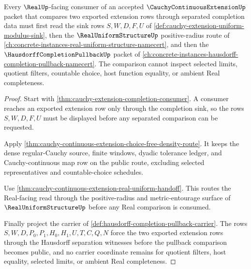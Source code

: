 \begin{theorem}
\label{thm:cauchy-continuous-extension-hausdorff-pullback-route}
Every $\RealUp$-facing consumer of an accepted $\CauchyContinuousExtensionUp$ packet that compares two exported extension rows through separated completion data must first read the sink rows $S,W,D,F,U$ of \autoref{def:cauchy-extension-uniform-modulus-sink}, then the $\RealUniformStructureUp$ positive-radius route of \autoref{ch:concrete-instances-real-uniform-structure-namecert}, and then the $\HausdorffCompletionPullbackUp$ packet of \autoref{ch:concrete-instances-hausdorff-completion-pullback-namecert}. The comparison cannot inspect selected limits, quotient filters, countable choice, host function equality, or ambient Real completeness.
\end{theorem}
\begin{proof}
Start with \autoref{thm:cauchy-extension-completion-consumer}. A consumer reaches an exported extension row only through the completion sink, so the rows $S,W,D,F,U$ must be displayed before any separated comparison can be requested.

Apply \autoref{thm:cauchy-continuous-extension-choice-free-density-route}. It keeps the dense regular-Cauchy source, finite windows, dyadic tolerance ledger, and Cauchy-continuous map row on the public route, excluding selected representatives and countable-choice schedules.

Use \autoref{thm:cauchy-continuous-extension-real-uniform-handoff}. This routes the Real-facing read through the positive-radius and metric-entourage surface of $\RealUniformStructureUp$ before any Real comparison is consumed.

Finally project the carrier of \autoref{def:hausdorff-completion-pullback-carrier}. The rows $S,W,D,P_0,P_1,H_0,H_1,U,T,C,Q,N$ force the two exported extension rows through the Hausdorff separation witnesses before the pullback comparison becomes public, and no carrier coordinate remains for quotient filters, host equality, selected limits, or ambient Real completeness.
\end{proof}

